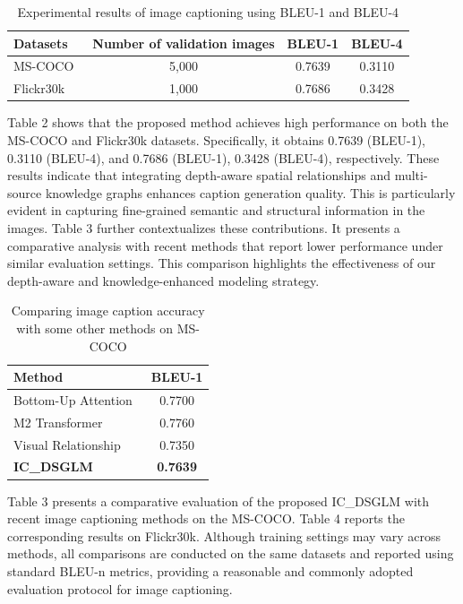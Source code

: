 \documentclass[runningheads,14pt]{llncs}
\begin{document}
\begin{table}[!htbp]
\centering
\caption{Experimental results of image captioning using BLEU-1 and BLEU-4}
\label{tab:caption_results}
\setlength{\tabcolsep}{10pt}
\begin{tabular}{lccc}
\toprule
\textbf{Datasets} & \textbf{Number of validation images} & \textbf{BLEU-1} & \textbf{BLEU-4} \\
\midrule
MS-COCO~\cite{coco}   & 5,000 & 0.7639 & 0.3110 \\
Flickr30k~\cite{flickr30k} & 1,000 & 0.7686 & 0.3428 \\
\bottomrule
\end{tabular}
\end{table}

Table 2 shows that the proposed method achieves high performance on both the MS-COCO and Flickr30k datasets. Specifically, it obtains 0.7639 (BLEU-1), 0.3110 (BLEU-4), and 0.7686 (BLEU-1), 0.3428 (BLEU-4), respectively. These results indicate that integrating depth-aware spatial relationships and multi-source knowledge graphs enhances caption generation quality. This is particularly evident in capturing fine-grained semantic and structural information in the images. Table 3 further contextualizes these contributions. It presents a comparative analysis with recent methods that report lower performance under similar evaluation settings. This comparison highlights the effectiveness of our depth-aware and knowledge-enhanced modeling strategy.

\begin{table}[!htbp]
\centering
\caption{Comparing image caption accuracy with some other methods on MS-COCO}
\label{tab:ms_coco_comparison}
\setlength{\tabcolsep}{10pt}
\begin{tabular}{lc}
\toprule
\textbf{Method} & \textbf{BLEU-1} \\
\midrule
Bottom-Up Attention~\cite{anderson2018bottom}      & 0.7700 \\
M2 Transformer~\cite{cornia2020meshed}           & 0.7760 \\
Visual Relationship~\cite{yao2018exploring}      & 0.7350 \\
\textbf{IC\_DSGLM}                               & \textbf{0.7639} \\
\bottomrule
\end{tabular}
\end{table}

Table 3 presents a comparative evaluation of the proposed IC\_DSGLM with recent image captioning methods on the MS-COCO. Table 4 reports the corresponding results on Flickr30k. Although training settings may vary across methods, all comparisons are conducted on the same datasets and reported using standard BLEU-n metrics, providing a reasonable and commonly adopted evaluation protocol for image captioning.
\end{document}
